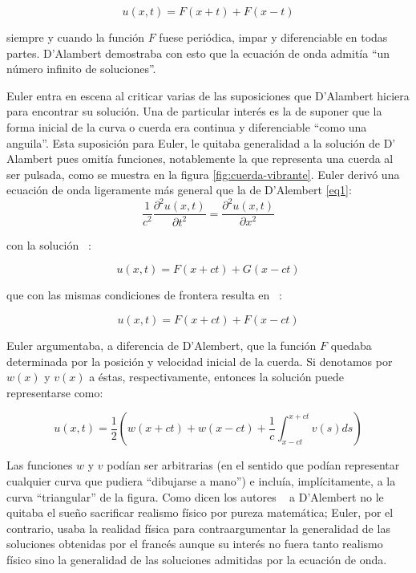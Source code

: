 \begin{equation}\label{eq4}
	u(x,t) =   F\left( x+t \right) + F\left( x-t \right)
\end{equation}

siempre y cuando la función \( F \) fuese periódica, impar y diferenciable en todas partes. D’Alambert demostraba con esto que la ecuación de onda admitía “un número infinito de soluciones”. \newline 

Euler entra en escena al criticar varias de las suposiciones que D'Alambert hiciera para encontrar su solución. Una de particular interés es la de suponer que la forma inicial de la curva o cuerda era continua y diferenciable “como una anguila”. Esta suposición para Euler, le quitaba generalidad a la solución de D' Alambert pues omitía funciones, notablemente la que representa una cuerda al
ser pulsada, como se muestra en la figura \ref{fig:cuerda-vibrante}.
Euler derivó una ecuación de onda ligeramente más general que la de D'Alembert \ref{eq1}:
\begin{equation}\label{eq5}	
	\frac{1}{c^2} \frac{\partial^2 u(x,t)}{\partial t^2} = \frac{\partial^2 u(x,t)}{\partial x^2} 
\end{equation}

con la solución ~\cite{demostracion-onda}:

\begin{equation}\label{eq6}	
	u(x,t) = F(x+ct) + G(x-ct)
\end{equation}

que con las mismas condiciones de frontera resulta en ~\cite{demostracion-onda}:

\begin{equation}\label{eq7}	
	u(x,t) = F(x+ct) + F(x-ct)
\end{equation}


Euler argumentaba, a diferencia de D'Alembert, que la función \( F \) quedaba determinada por la posición y velocidad inicial de la cuerda. Si denotamos por \( w(x) \) y \( v(x) \) a éstas, respectivamente, entonces la solución puede representarse como:


\begin{equation}\label{eq8}	
	u(x,t) = \frac{1}{2} \left( w(x+ct) + w(x-ct) + \frac{1}{c} \int_{x-ct}^{x+ct} v(s) ds \right)
\end{equation}

Las funciones \( w \) y \( v \) podían ser arbitrarias (en el sentido que podían representar cualquier curva que pudiera “dibujarse a mano”) e incluía, implícitamente, a la curva “triangular” de la figura. Como dicen los autores ~\cite{bernoulli_Mechanics} a D'Alembert no le quitaba el sueño sacrificar realismo físico por pureza matemática; Euler, por el contrario, usaba la realidad física para contraargumentar la generalidad de las soluciones obtenidas por el francés aunque su interés no fuera tanto realismo físico sino la generalidad de las soluciones admitidas por la ecuación de onda.

